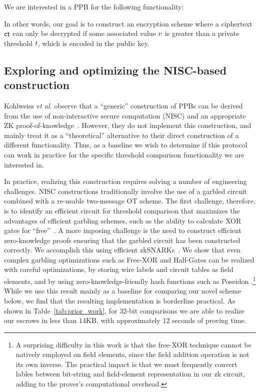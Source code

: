 We are interested in a PPB for the following functionality:
\fthrfull

\noindent
In other words, our goal is to construct an encryption scheme where a ciphertext $\mathsf{ct}$ can only be decrypted if some associated value $v$ is greater than a private threshold $t$, which is encoded in the public key.

\subsection{Exploring and optimizing the NISC-based construction}
Kohlweiss \emph{et al.} observe that a ``generic'' construction of PPBs can be derived from the use of non-interactive secure computation (NISC) and an appropriate ZK proof-of-knowledge~\cite{EC:KohLysNgu23}. However, they do not implement this construction, and mainly treat it as a ``theoretical'' alternative to their direct construction of a different functionality.  Thus, as a baseline we wish to determine if this protocol can work in practice for the specific threshold comparison functionality we are interested in.

In practice, realizing this construction requires solving a number of engineering challenges. NISC constructions traditionally involve the use of a garbled circuit combined with a re-usable two-message OT scheme. The first challenge, therefore, is to identify an efficient circuit for threshold comparison that maximizes the advantages of efficient garbling schemes, such as the ability to calculate XOR gates for ``free''~\cite{CANS:KolSadSch09}. A more imposing challenge is the need to construct efficient zero-knowledge proofs ensuring that the garbled circuit has been constructed correctly. We accomplish this using efficient zkSNARKs~\cite{EC:Groth16}. We show that even complex garbling optimizations such as Free-XOR \cite{CANS:KolSadSch09} and Half-Gates \cite{EC:ZahRosEva15} can be realized with careful optimizations, by storing wire labels and circuit tables as field elements, and by using zero-knowledge-friendly hash functions such as Poseidon \cite{USENIX:GKRRS21}.\footnote{A surprising difficulty in this work is that the free-XOR technique cannot be natively employed on field elements, since the field addition operation is not its own inverse. The practical impact is that we must frequently convert lables between bit-string and field-element representation in our zk circuit, adding to the prover's computational overhead.}
While we use this result mainly as a baseline for comparing our novel scheme below, we find that the resulting implementation is borderline practical. As shown in Table~\ref{tab:prior_work}, for $32$-bit comparisons we are able to realize our escrows in less than $14$KB, with approximately 12 seconds of proving time.

